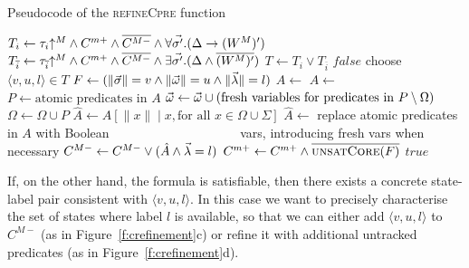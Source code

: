 \begin{algorithm}[t]

\caption{Pseudocode of the \textsc{refineCpre} function}
\label{alg:refineCpre}
\begin{algorithmic}[1]
    \State {}
    \State $T_i         \gets \tau_i\mathord{\uparrow^M} \land C^{m+} 
    \land {\overline{C^{M-}}} \land \forall \vec{\sigma'}. (\Delta \rightarrow (W^M)')$
    \State {}
    \State $T_{\overline{i}} \gets \tau_{\overline{i}}\mathord{\uparrow^M} \land C^{m+} \land {\overline{C^{M-}}} \land \exists \vec{\sigma'}. (\Delta \land \overline{(W^M)'})$
    \State $T           \gets T_i \lor T_{\overline{i}}$
        \Return $false$ 
    \Else
        \State choose $\langle v,u,l\rangle \in T$
        \State $F \gets (\|\vec{\sigma}\|=v \land \|\vec{\omega}\|=u \land \|\vec{\lambda}\|=l)$
         \label{a:refineCpre:sat}
            \State $A             \gets $  \label{a:refineCpre:quant}
            \State $A             \gets $ 
            \State $P             \gets \text{atomic predicates in }A$
            \State $\vec{\omega} \gets \vec{\omega} \cup (\text{fresh variables for predicates in } P\setminus\Omega)$
            \State $\Omega        \gets \Omega \cup P$
            \State $\hat{A}       \gets A[\|x\|\mid x, \text{for all } x\in\Omega \cup \Sigma ]$
            \State $\hat{A}       \gets$ replace atomic predicates in $A$ with Boolean
            \Statex  ~~~~~~~~~~~~~~~~~~~~vars, introducing fresh vars when necessary
            \State $C^{M-}        \gets C^{M-} \lor (\hat{A}\land \vec{\lambda}=l)$%
        \Else
            \State $C^{m+}\gets C^{m+} \land \overline{\textsc{unsatCore}(F)}$ \label{a:refineCpre:core}%
        \EndIf
        \State \Return $true$
    \EndIf
\EndFunction
\end{algorithmic}
\end{algorithm}

If, on the other hand, the formula is satisfiable, then there exists a concrete state-label pair consistent with $\langle v,u,l\rangle$.  In this case we want to precisely characterise the set of states where label $l$ is available, so that we can either add $\langle v,u,l\rangle$ to $C^{M-}$ (as in Figure~\ref{f:crefinement}c) or refine it with additional untracked predicates (as in Figure~\ref{f:crefinement}d).

